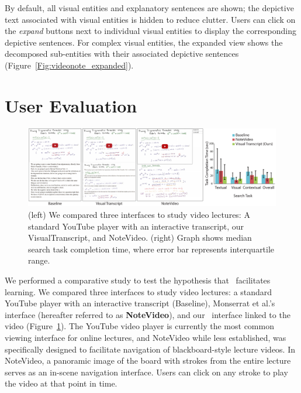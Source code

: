 By default, all visual entities and explanatory sentences are shown; the depictive text associated with visual entities is hidden to reduce clutter. Users can click on the \emph{expand} buttons next to individual visual entities to display the corresponding depictive sentences. For complex visual entities, the expanded view shows the decomposed sub-entities with their associated depictive sentences (Figure~\ref{Fig:videonote_expanded}).\\

\section{User Evaluation}
\label{visualtranscript-usereval}
%
\begin{figure}[h]
    \centering
          \includegraphics[width=\textwidth]{figures/evaluation-interfaces.pdf}
         \captionsetup{font=footnotesize}
         \caption{(left) We compared three interfaces to study video lectures: A standard YouTube player with an interactive transcript, our VisualTranscript, and NoteVideo. (right) Graph shows median search task completion time, where error bar represents interquartile range.}
    \label{Fig:interfaces}
\end{figure} 
%
We performed a comparative study to test the hypothesis that \systemname\ facilitates learning. We compared three interfaces to study video lectures: a standard YouTube player with an interactive transcript (Baseline), Monserrat et al.'s interface \cite{monserrat2013notevideo} (hereafter referred to as \textbf{NoteVideo}), and our \systemname\ interface linked to the video (Figure~\ref{Fig:interfaces}). The YouTube video player is currently the most common viewing interface for online lectures, and NoteVideo while less established, was specifically designed to facilitate navigation of blackboard-style lecture videos. In NoteVideo, a panoramic image of the board with strokes from the entire lecture serves as an in-scene navigation interface. Users can click on any stroke to play the video at that point in time.
%
